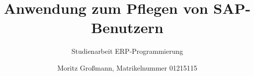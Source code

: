 


	
	\title{Anwendung zum Pflegen von SAP-Benutzern}
	
	\subtitle{Studienarbeit ERP-Programmierung}
	\author{Moritz Großmann, Matrikelnummer 01215115}
	\maketitle
	
	\newpage

	\tableofcontents
	
	\newpage
    
    
    
    
    
    
    
